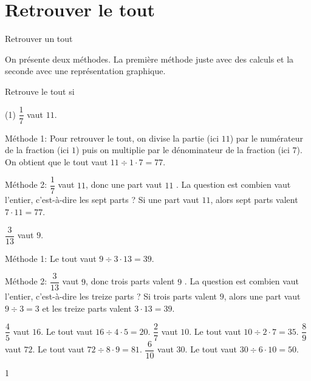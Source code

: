 \documentclass[a4paper,11pt]{report}
\begin{document}
\section*{Retrouver le tout}
\begin{resolu}{Retrouver un tout}{

On présente deux méthodes. La première méthode juste avec des calculs et la seconde avec une représentation graphique. 

Retrouve le tout si
\begin{tasks}[after-item-skip = 0.3em, after-skip=-0.5em](1)
	\task $\dfrac{1}{7}$ vaut $11$. 

		Méthode 1: Pour retrouver le tout, on divise la partie (ici $11$) par le numérateur de la fraction (ici $1$) puis on multiplie par le dénominateur de la fraction (ici $7$). On obtient que le tout vaut $11\div 1\cdot 7=77$.

	Méthode 2:	$\dfrac{1}{7}$ vaut $11$, donc une part vaut $11$ 
. La question est combien vaut l'entier, c'est-à-dire les sept parts 
? Si une part vaut $11$, alors sept parts valent $7\cdot 11=77$. 

	\task $\dfrac{3}{13}$ vaut $9$. 

		Méthode 1: Le tout vaut $9\div 3\cdot 13=39$.
		
		Méthode 2: $\dfrac{3}{13}$ vaut $9$, donc trois parts valent $9$ 
. La question est combien vaut l'entier, c'est-à-dire les treize parts 
? Si trois parts valent $9$, alors une part vaut $9\div 3=3$ et les treize parts valent $3\cdot 13=39$. 

	\task $\dfrac{4}{5}$ vaut $16$. Le tout vaut $16\div 4\cdot 5=20$.
	\task $\dfrac{2}{7}$ vaut $10$. Le tout vaut $10\div 2 \cdot 7=35$.
	\task $\dfrac{8}{9}$ vaut $72$. Le tout vaut $72\div 8\cdot 9=81$.
	\task $\dfrac{6}{10}$ vaut $30$. Le tout vaut $30\div 6\cdot 10=50.$
\end{tasks}
}{1}\end{resolu}
\end{document}
